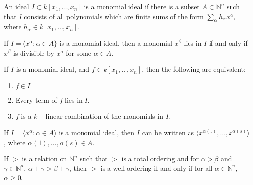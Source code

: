 \documentclass[crop=false,class=book,oneside]{standalone}
\begin{document}
\begin{definition}
An ideal $I\subset k[x_1,\hdots ,x_n]$ is a monomial ideal if there is a subset $A\subset \mathbb{N}^n$ such that $I$ consists of all polynomials which are finite sums of the form $\sum_{\alpha} h_{\alpha} x^\alpha$, where $h_{\alpha} \in k[x_1,\hdots ,x_n]$. 
\end{definition}
\begin{theorem}
If $I=\langle x^\alpha: \alpha \in A\}$ is a monomial ideal, then a monomial $x^\beta$ lies in $I$ if and only if $x^\beta$ is divisible by $x^\alpha$ for some $\alpha \in A$.
\end{theorem}
\begin{theorem}
If $I$ is a monomial ideal, and $f\in k[x_1,\hdots ,x_n]$, then the following are equivalent:
\begin{enumerate}
        \item $f\in I$
        \item Every term of $f$ lies in $I$.
        \item $f$ is a $k-$linear combination of the monomials in $I$.
\end{enumerate}
\end{theorem}
\begin{theorem}
If $I=\langle x^\alpha: \alpha \in A\rangle$ is a monomial ideal, then $I$ can be written as $\langle x^{\alpha(1)}, \hdots, x^{\alpha(s)}\rangle$, where $\alpha(1),\hdots, \alpha(s) \in A$. 
\end{theorem}
\begin{theorem}
If $>$ is a relation on $\mathbb{N}^n$ such that $>$ is a total ordering and for $\alpha>\beta$ and $\gamma\in \mathbb{N}^n$, $\alpha+\gamma>\beta+\gamma$, then $>$ is a well-ordering if and only if for all $\alpha \in \mathbb{N}^n$, $\alpha \geq 0$.
\end{theorem}
\end{document}
